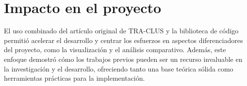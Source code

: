 \section{Impacto en el proyecto}

El uso combinado del artículo original de TRA-CLUS y la biblioteca de código permitió acelerar el desarrollo y centrar los esfuerzos en aspectos diferenciadores del proyecto, como la visualización y el análisis comparativo. Además, este enfoque demostró cómo los trabajos previos pueden ser un recurso invaluable en la investigación y el desarrollo, ofreciendo tanto una base teórica sólida como herramientas prácticas para la implementación.
